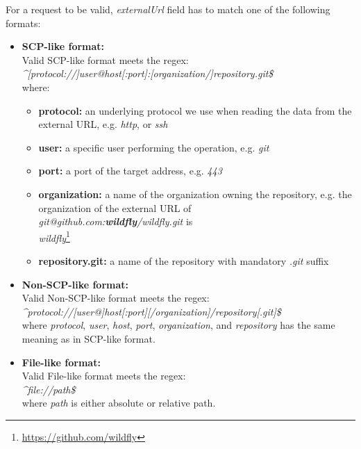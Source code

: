 \documentclass[../main.tex]{subfiles}
\begin{document}
For a request to be valid, \textit{externalUrl} field has to match one of the following formats:

\begin{itemize}
    \item \textbf{SCP-like format:}\\
    Valid SCP-like format meets the regex:\\
    \textit{\textasciicircum [protocol://]user@host[:port]:[organization/]repository.git\$}\\
    where:
    \begin{itemize}
        \item \textbf{protocol:} an underlying protocol we use when reading the data from the external URL, e.g. \textit{http}, or \textit{ssh}

        \item \textbf{user:} a specific user performing the operation, e.g. \textit{git}

        \item \textbf{port:} a port of the target address, e.g. \textit{443}

        \item \textbf{organization:} a name of the organization owning the repository, e.g. the organization of the external URL of\\ \textit{git@github.com:\textbf{wildfly}/wildfly.git} is\\
        \textit{wildfly}\footnote{\url{https://github.com/wildfly}}

        \item \textbf{repository.git:} a name of the repository with mandatory \textit{.git} suffix
    \end{itemize}

    \item \textbf{Non-SCP-like format:}\\
    Valid Non-SCP-like format meets the regex:\\
    \textit{\textasciicircum protocol://[user@]host[:port][/organization]/repository[.git]\$}\\
    where \textit{protocol}, \textit{user}, \textit{host}, \textit{port}, \textit{organization}, and \textit{repository} has the same meaning as in SCP-like format.

    \item \textbf{File-like format:}\\
    Valid File-like format meets the regex:\\ \textit{\textasciicircum file://path\$}\\
    where \textit{path} is either absolute or relative path.
\end{itemize}
\end{document}
